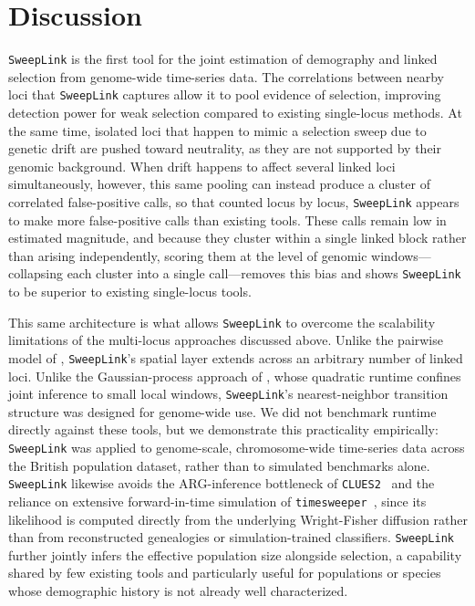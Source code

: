 \documentclass{article}
\newcommand{\SweepLink}{\texttt{SweepLink}\xspace}
\newcommand{\CLUES}{\texttt{CLUES2}\xspace}
\newcommand{\timesweeper}{\texttt{timesweeper}\xspace}
\begin{document}
\section{Discussion}

\SweepLink is the first tool for the joint estimation of demography and linked selection from genome-wide time-series data.
The correlations between nearby loci that \SweepLink captures allow it to pool evidence of selection, improving detection power for weak selection compared to existing single-locus methods.
At the same time, isolated loci that happen to mimic a selection sweep due to genetic drift are pushed toward neutrality, as they are not supported by their genomic background.
When drift happens to affect several linked loci simultaneously, however, this same pooling can instead produce a cluster of correlated false-positive calls, so that counted locus by locus, \SweepLink appears to make more false-positive calls than existing tools.
These calls remain low in estimated magnitude, and because they cluster within a single linked block rather than arising independently, scoring them at the level of genomic windows---collapsing each cluster into a single call---removes this bias and shows \SweepLink to be superior to existing single-locus tools.

This same architecture is what allows \SweepLink to overcome the scalability limitations of the multi-locus approaches discussed above.
Unlike the pairwise model of \citep{he2020}, \SweepLink's spatial layer extends across an arbitrary number of linked loci.
Unlike the Gaussian-process approach of \citet{terhorst2015}, whose quadratic runtime confines joint inference to small local windows, \SweepLink's nearest-neighbor transition structure was designed for genome-wide use.
We did not benchmark runtime directly against these tools, but we demonstrate this practicality empirically: \SweepLink was applied to genome-scale, chromosome-wide time-series data across the British population dataset, rather than to simulated benchmarks alone.
\SweepLink likewise avoids the ARG-inference bottleneck of \CLUES~\citep{vaughn2024} and the reliance on extensive forward-in-time simulation of \timesweeper~\citep{whitehouse2023}, since its likelihood is computed directly from the underlying Wright-Fisher diffusion rather than from reconstructed genealogies or simulation-trained classifiers.
\SweepLink further jointly infers the effective population size alongside selection, a capability shared by few existing tools and particularly useful for populations or species whose demographic history is not already well characterized.
\end{document}
